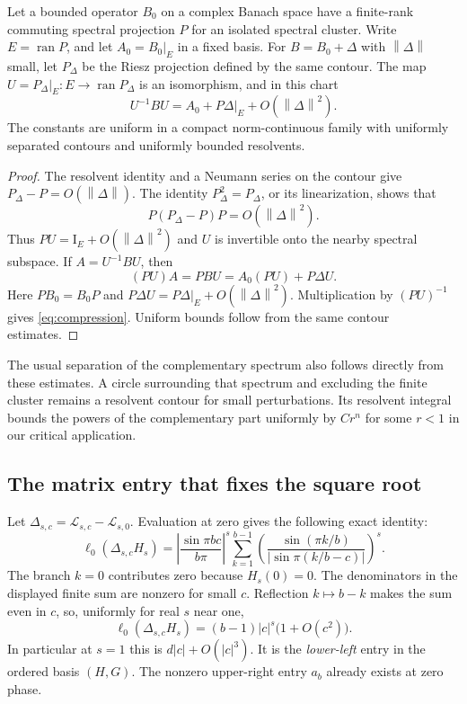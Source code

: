 \documentclass[11pt,a4paper]{article}
\numberwithin{equation}{section}
\theoremstyle{definition}
\theoremstyle{remark}
\newcommand{\Lop}{\mathcal L}
\newcommand{\Id}{\mathrm I}
\newcommand{\norm}[1]{\left\lVert#1\right\rVert}
\begin{document}
\begin{lemma}
\label{lem:compression}
Let a bounded operator $B_0$ on a complex Banach space have a finite-rank
commuting spectral projection $P$ for an isolated spectral cluster.
Write $E=\operatorname{ran}P$, and let $A_0=B_0|_E$ in a fixed basis.
For $B=B_0+\Delta$ with $\norm\Delta$ small, let $P_\Delta$ be the Riesz
projection defined by the same contour. The map
$U=P_\Delta|_E:E\to\operatorname{ran}P_\Delta$ is an isomorphism, and
in this chart
\begin{equation}
 U^{-1}BU=A_0+P\Delta|_E+O(\norm\Delta^2).
 \label{eq:compression}
\end{equation}
The constants are uniform in a compact norm-continuous family with
uniformly separated contours and uniformly bounded resolvents.
\end{lemma}
\begin{proof}
The resolvent identity and a Neumann series on the contour give
$P_\Delta-P=O(\norm\Delta)$. The identity $P_\Delta^2=P_\Delta$, or
its linearization, shows that
\[
 P(P_\Delta-P)P=O(\norm\Delta^2).
\]
Thus $PU=\Id_E+O(\norm\Delta^2)$ and $U$ is invertible onto the nearby
spectral subspace. If $A=U^{-1}BU$, then
\[
 (PU)A=PBU=A_0(PU)+P\Delta U.
\]
Here $PB_0=B_0P$ and $P\Delta U=P\Delta|_E+O(\norm\Delta^2)$.
Multiplication by $(PU)^{-1}$ gives \cref{eq:compression}.
Uniform bounds follow from the same contour estimates.
\end{proof}

The usual separation of the complementary spectrum also follows
directly from these estimates. A circle surrounding that spectrum and
excluding the finite cluster remains a resolvent contour for small
perturbations. Its resolvent integral bounds the powers of the
complementary part uniformly by $Cr^n$ for some $r<1$ in our critical
application.

\subsection{The matrix entry that fixes the square root}
Let $\Delta_{s,c}=\Lop_{s,c}-\Lop_{s,0}$.
Evaluation at zero gives the following exact identity:
\begin{equation}
 \ell_0(\Delta_{s,c}H_s)=
 \left|\frac{\sin\pi bc}{b\pi}\right|^s
 \sum_{k=1}^{b-1}
 \left(\frac{\sin(\pi k/b)}{|\sin\pi(k/b-c)|}\right)^s.
 \label{eq:lower-left-exact}
\end{equation}
The branch $k=0$ contributes zero because $H_s(0)=0$.
The denominators in the displayed finite sum are nonzero for small $c$.
Reflection $k\mapsto b-k$ makes the sum even in $c$, so, uniformly for
real $s$ near one,
\begin{equation}
 \ell_0(\Delta_{s,c}H_s)
 =(b-1)|c|^s\bigl(1+O(c^2)\bigr).
 \label{eq:lower-left}
\end{equation}
In particular at $s=1$ this is $d|c|+O(|c|^3)$.
It is the \emph{lower-left} entry in the ordered basis $(H,G)$.
The nonzero upper-right entry $a_b$ already exists at zero phase.
\end{document}
